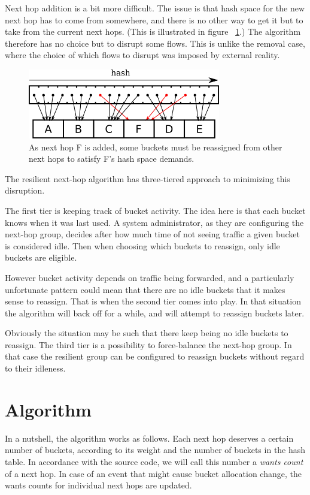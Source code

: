 \documentclass[letterpaper]{article}
\begin{document}
Next hop addition is a bit more difficult. The issue is that hash space for
the new next hop has to come from somewhere, and there is no other way to
get it but to take from the current next hops. (This is illustrated in
figure ~\ref{fig:reshash-addition}.) The algorithm therefore has no choice
but to disrupt some flows. This is unlike the removal case, where the
choice of which flows to disrupt was imposed by external reality.

\begin{figure}[H]
\includegraphics[width=3.31in]{reshash-addition.png}
\caption{As next hop F is added, some buckets must be reassigned from other
  next hops to satisfy F's hash space demands.}
\label{fig:reshash-addition}
\end{figure}

The resilient next-hop algorithm has three-tiered approach to minimizing
this disruption.

The first tier is keeping track of bucket activity. The idea here is that
each bucket knows when it was last used. A system administrator, as they
are configuring the next-hop group, decides after how much time of not
seeing traffic a given bucket is considered idle. Then when choosing which
buckets to reassign, only idle buckets are eligible.

However bucket activity depends on traffic being forwarded, and a
particularly unfortunate pattern could mean that there are no idle buckets
that it makes sense to reassign. That is when the second tier comes into
play. In that situation the algorithm will back off for a while, and will
attempt to reassign buckets later.

Obviously the situation may be such that there keep being no idle buckets
to reassign. The third tier is a possibility to force-balance the next-hop
group. In that case the resilient group can be configured to reassign
buckets without regard to their idleness.

\section{Algorithm}

In a nutshell, the algorithm works as follows. Each next hop deserves a
certain number of buckets, according to its weight and the number of
buckets in the hash table. In accordance with the source code, we will call
this number a \emph{wants count} of a next hop. In case of an event that
might cause bucket allocation change, the wants counts for individual next
hops are updated.
\end{document}
